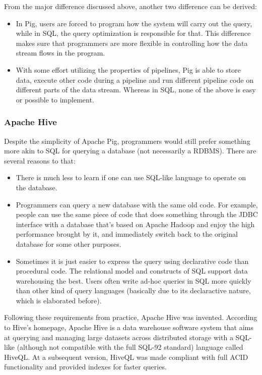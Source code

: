 \documentclass{article}
\begin{document}
From the major difference discussed above, another two difference can be derived:
\begin{itemize}
\item In Pig, users are forced to program how the system will carry
  out the query, while in SQL, the query optimization is responsible
  for that. This difference makes sure that programmers are more
  flexible in controlling how the data stream flows in the program.
\item With some effort utilizing the properties of pipelines, Pig is
  able to store data, execute other code during a pipeline and run
  different pipeline code on different parts of the data
  stream. Whereas in SQL, none of the above is easy or possible to
  implement.
\end{itemize}

\subsubsection{Apache Hive}

Despite the simplicity of Apache Pig, programmers would still prefer something more akin to SQL for querying a database (not necessarily a RDBMS). There are several reasons to that:

\begin{itemize}
\item There is much less to learn if one can use SQL-like language to operate on the database.
\item Programmers can query a new database with the same old code. For example, people can use the same piece of code that does something through the JDBC interface with a database that's based on Apache Hadoop and enjoy the high performance brought by it, and immediately switch back to the original database for some other purposes.
\item Sometimes it is just easier to express the query using declarative code than procedural code. The relational model and constructs of SQL support data warehousing the best. Users often write ad-hoc queries in SQL more quickly than other kind of query languages\cite{pig-at-yahoo} (basically due to its declaractive nature, which is elaborated before).
\end{itemize}

Following these requirements from practice, Apache Hive was invented. According to Hive's homepage, Apache Hive is a data warehouse software system that aims at querying and managing large datasets across distributed storage with a SQL-like (although not compatible with the full SQL-92 standard) language called HiveQL. At a subsequent version, HiveQL was made compliant with full ACID functionality and provided indexes for faster queries.
\end{document}
